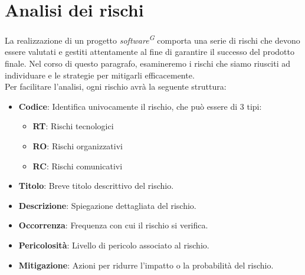 \documentclass[5pt]{article}
\begin{document}
\section{Analisi dei rischi}
  La realizzazione di un progetto \textit{software\textsuperscript{G}} comporta una serie di rischi che devono essere valutati e gestiti attentamente al fine di garantire il successo del prodotto finale. Nel corso di questo paragrafo, esamineremo i rischi che siamo riusciti ad individuare e le strategie per mitigarli efficacemente. \\[1\baselineskip]
  Per facilitare l'analisi, ogni rischio avrà la seguente struttura:
  \begin{itemize}
    \item \textbf{Codice}: Identifica univocamente il rischio, che può essere di 3 tipi:
        \begin{itemize}
        \item \textbf{RT}: Rischi tecnologici
        \item \textbf{RO}: Rischi organizzativi
        \item \textbf{RC}: Rischi comunicativi
        \end{itemize}
    \item \textbf{Titolo}: Breve titolo descrittivo del rischio.
    \item \textbf{Descrizione}: Spiegazione dettagliata del rischio.
    \item \textbf{Occorrenza}: Frequenza con cui il rischio si verifica.
    \item \textbf{Pericolosità}: Livello di pericolo associato al rischio.
    \item \textbf{Mitigazione}: Azioni per ridurre l'impatto o la probabilità del rischio.
  \end{itemize}
\end{document}
